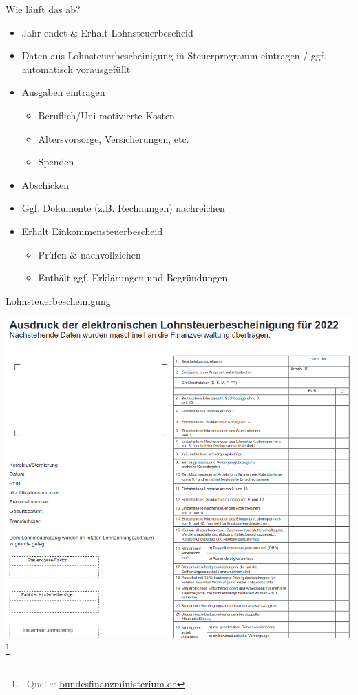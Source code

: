 \documentclass{beamer}
\let\oldfootnote\footnote
\renewcommand{\footnote}[1]
{%
	\oldfootnote
	{
		\tiny
		\textcolor{gray}{\ #1}
	}%
}
\newcommand{\citeurl}[2]
{%
	\footnote{Quelle: \href{#1}{#2}}
}
\begin{document}
			\begin{frame}{Wie läuft das ab?}
				\begin{itemize}
					\item Jahr endet \& Erhalt Lohnsteuerbescheid
					\item Daten aus Lohnsteuerbescheinigung in Steuerprogramm eintragen / ggf. automatisch vorausgefüllt
					\item Ausgaben eintragen
					\begin{itemize}
						\item Beruflich/Uni motivierte Kosten
						\item Altersvorsorge, Versicherungen, etc.
						\item Spenden
					\end{itemize}
					\item Abschicken
					\item Ggf. Dokumente (z.B. Rechnungen) nachreichen
					\item Erhalt Einkommensteuerbescheid
					\begin{itemize}
						\item Prüfen \& nachvollziehen
						\item Enthält ggf. Erklärungen und Begründungen
					\end{itemize}
				\end{itemize}
			\end{frame}
		
			\begin{frame}{Lohnsteuerbescheinigung}
				\begin{center}
					\includegraphics[width=0.65\linewidth]{images/lohnsteuerbescheinigung}
					\citeurl{https://www.bundesfinanzministerium.de/Content/DE/Downloads/BMF_Schreiben/Steuerarten/Lohnsteuer/2022-07-15-bekanntmachung-geaendertes-muster-ausdruck-elektronische-LSt-bescheinigung-2022.pdf}{bundesfinanzministerium.de}
				\end{center}
			\end{frame}
		
\end{document}

